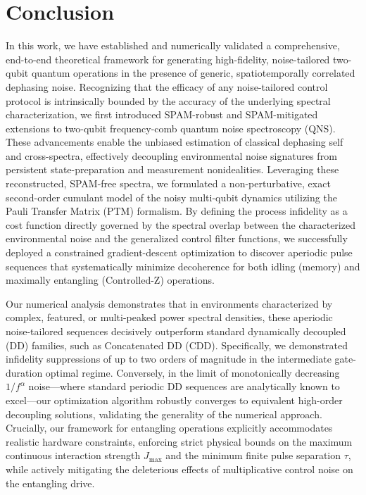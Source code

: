 \documentclass[%
 reprint,
superscriptaddress,
 amsmath,amssymb,
 aps,
pra,
]{revtex4-2}
\newcommand{\qk}[1]{{\color{OliveGreen}#1}}
\begin{document}

\section{Conclusion}
\label{sec::conclusion}

In this work, we have established and numerically validated a comprehensive, end-to-end theoretical framework for generating high-fidelity, noise-tailored two-qubit quantum operations in the presence of generic, spatiotemporally correlated dephasing noise. Recognizing that the efficacy of any noise-tailored control protocol is intrinsically bounded by the accuracy of the underlying spectral characterization, we first introduced SPAM-robust and SPAM-mitigated extensions to two-qubit frequency-comb quantum noise spectroscopy (QNS). These advancements enable the unbiased estimation of classical dephasing self and cross-spectra, effectively decoupling environmental noise signatures from persistent state-preparation and measurement nonidealities. Leveraging these reconstructed, SPAM-free spectra, we formulated a non-perturbative, exact second-order cumulant model of the noisy multi-qubit dynamics utilizing the Pauli Transfer Matrix (PTM) formalism. By defining the process infidelity as a cost function directly governed by the spectral overlap between the characterized environmental noise and the generalized control filter functions, we successfully deployed a constrained gradient-descent optimization to discover aperiodic pulse sequences that systematically minimize decoherence for both idling (memory) and maximally entangling (Controlled-Z) operations.

Our numerical analysis demonstrates that in environments characterized by complex, featured, or multi-peaked power spectral densities, these aperiodic noise-tailored sequences decisively outperform standard dynamically decoupled (DD) families, such as Concatenated DD (CDD). Specifically, we demonstrated infidelity suppressions of up to two orders of magnitude in the intermediate gate-duration optimal regime. Conversely, in the limit of monotonically decreasing $1/f^\alpha$ noise—where standard periodic DD sequences are analytically known to excel—our optimization algorithm robustly converges to equivalent high-order decoupling solutions, validating the generality of the numerical approach. Crucially, our framework for entangling operations explicitly accommodates realistic hardware constraints, enforcing strict physical bounds on the maximum continuous interaction strength $J_\text{max}$ and the minimum finite pulse separation $\tau$, while actively mitigating the deleterious effects of multiplicative control noise on the entangling drive.
\end{document}

